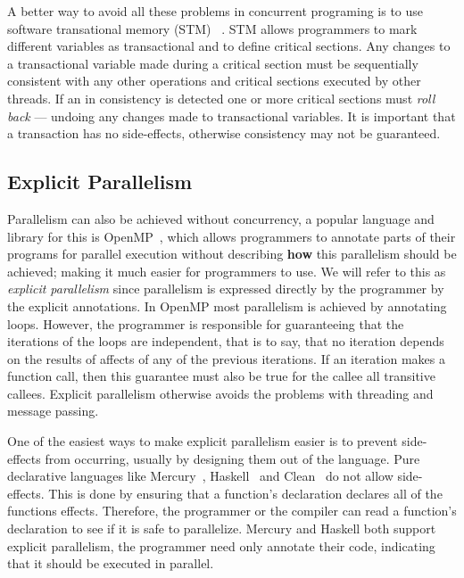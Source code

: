 A better way to avoid all these problems in concurrent programing is to use
software transational memory (STM)~%
\cite{harris_marlow_spj:haskell-stm, mika:mercury-stm}.
STM allows programmers to mark different variables as transactional
and to define critical sections.
Any changes to a transactional variable made during a critical section must
be sequentially consistent with any other operations and critical
sections executed by other threads.
If an in consistency is detected one or more critical sections must
\emph{roll back} --- undoing any changes made to transactional
variables.
It is important that a transaction has no side-effects, otherwise
consistency may not be guaranteed.


\subsection{Explicit Parallelism}
\label{sec:back_par_explicit}

Parallelism can also be achieved without concurrency,
a popular language and library for this is OpenMP~\cite{openmp},
which allows programmers to annotate parts of their programs for parallel
execution without describing \textbf{how} this parallelism should be achieved;
making it much easier for programmers to use.
We will refer to this as \emph{explicit parallelism}
since parallelism is expressed directly by the programmer by the explicit
annotations.
In OpenMP most parallelism is achieved by annotating loops.
However,
the programmer is responsible for guaranteeing that the iterations of the loops
are independent,
that is to say, that no iteration depends on the results of affects of any of
the previous iterations.
If an iteration makes a function call, then this guarantee must also be true for
the callee all transitive callees.
Explicit parallelism otherwise avoids the problems with threading and message
passing.

One of the easiest ways to make explicit parallelism easier is to prevent
side-effects from occurring, usually by designing them out of the language.
Pure declarative languages like Mercury~\cite{mercury-jlp},
Haskell~\cite{haskell98} and Clean~\cite{1991:concurrent-clean} do not
allow side-effects.
This is done by ensuring that a function's declaration declares all of the
functions effects.
Therefore,
the programmer or the compiler can read a function's declaration to see if it
is safe to parallelize.
Mercury and Haskell both support explicit parallelism,
the programmer need only annotate their code, indicating that it should be
executed in parallel.

